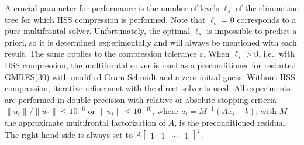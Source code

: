 \documentclass{article}
\begin{document}
A crucial parameter for performance is the number of levels $\ell_s$
of the elimination tree for which HSS compression is performed. Note
that $\ell_s = 0$ corresponds to a pure multifrontal
solver. Unfortunately, the optimal $\ell_s$ is impossible to predict a
priori, so it is determined experimentally and will always be
mentioned with each result. The same applies to the compression tolerance
$\varepsilon$. When $\ell_s > 0$, i.e., with HSS compression, the multifrontal solver
is used as a preconditioner for restarted GMRES($30$) with modified
Gram-Schmidt and a zero initial guess. Without HSS compression,
iterative refinement with the direct solver is used. All experiments
are performed in double precision with relative or absolute stopping
criteria $\| u_i\| / \|u_0\| \leq 10^{-6}$ or $\| u_i\| \leq
10^{-10}$, where $u_i = M^{-1}(A x_i - b)$, with $M$ the approximate
multifrontal factorization of $A$, is the preconditioned residual. The
right-hand-side is always set to $A \begin{bmatrix} 1 & 1 & \cdots &
  1 \end{bmatrix}^T$.
\end{document}
